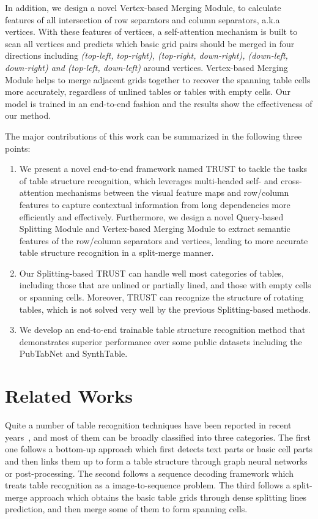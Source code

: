 \documentclass[lettersize,journal]{IEEEtran}
\begin{document}
In addition, we design a novel Vertex-based Merging Module, to calculate features of all intersection of row separators and column separators, a.k.a vertices. With these features of vertices, a self-attention mechanism is built to scan all vertices and predicts which basic grid pairs should be merged in four directions including \emph{(top-left, top-right), (top-right, down-right), (down-left, down-right) and (top-left, down-left)} around vertices. Vertex-based Merging Module helps to merge adjacent grids together to recover the spanning table cells more accurately, regardless of unlined tables or tables with empty cells. Our model is trained in an end-to-end fashion and the results show the effectiveness of our method.

The major contributions of this work can be summarized in the following three points:
\begin{enumerate}
\item We present a novel end-to-end framework named TRUST to tackle the tasks of table structure recognition, which leverages multi-headed self- and cross-attention mechanisms between the visual feature maps and row/column features to capture contextual information from long dependencies more efficiently and effectively. Furthermore, we design a novel Query-based Splitting Module and Vertex-based Merging Module to extract semantic features of the row/column separators and vertices, leading to more accurate table structure recognition in a split-merge manner.
\item Our Splitting-based TRUST can handle well most categories of tables, including those that are unlined or partially lined, and those with empty cells or spanning cells. Moreover, TRUST can recognize the structure of rotating tables, which is not solved very well by the previous Splitting-based methods.
\item We develop an end-to-end trainable table structure recognition method that demonstrates superior performance over some public datasets including the PubTabNet and SynthTable.
\end{enumerate}


\section{Related Works}
Quite a number of table recognition techniques have been reported in recent years~\cite{scarselli2008graph, xue2019res2tim, siddiqui2019deeptabstr}, and most of them can be broadly classified into three categories. The first one follows a bottom-up approach which first detects text parts or basic cell parts and then links them up to form a table structure through graph neural networks or post-processing. The second follows a sequence decoding framework which treats table recognition as a image-to-sequence problem. The third follows a split-merge approach which obtains the basic table grids through dense splitting lines prediction, and then merge some of them to form spanning cells. 
\end{document}
